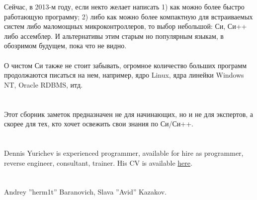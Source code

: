 \documentclass[11pt,a4paper,oneside]{book}
\begin{document}
Сейчас, в 2013-м году, если некто желает написать 1) как можно более быстро работающую программу; 2) либо как
можно более компактную для встраиваемых систем либо маломощных микроконтроллеров, то выбор небольшой:
Си, Си++ либо ассемблер. И альтернативы этим старым но популярным языкам, в обозримом будущем, 
пока что не видно. \\
\\
О чистом Си также не стоит забывать, огромное количество больших программ продолжаются писаться на нем, 
например, ядро Linux, ядра линейки Windows NT, Oracle RDBMS, итд.

\chapter{}

Этот сборник заметок предназначен не для начинающих, но и не для экспертов, а скорее для тех, 
кто хочет освежить свои знания по Си/Си++.

\chapter{}

{Dennis Yurichev is experienced programmer, available for hire as programmer, reverse engineer, consultant, trainer. 
His CV is available \href{http://yurichev.com/Dennis_Yurichev.pdf}{here}.}

\chapter{}

{Andrey ''herm1t'' Baranovich, Slava ''Avid'' Kazakov}.

\mainmatter






















%



\clearpage
\printindex
\end{document}
